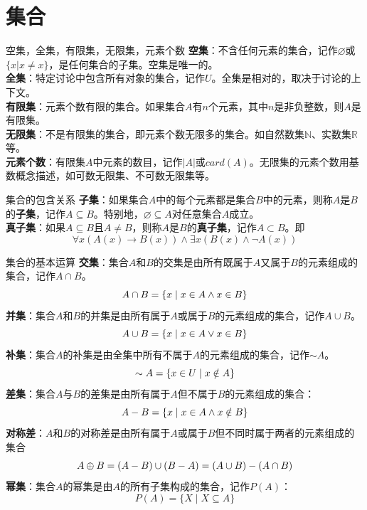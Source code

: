 \documentclass[lang=cn,11pt]{elegantbook}
\newcommand{\nothing}{\ensuremath{\varnothing}}
\begin{document}
\section{集合}
\begin{definition}{空集，全集，有限集，无限集，元素个数}
\textbf{空集}：不含任何元素的集合，记作$\nothing$或$\{x|x\ne x\}$，是任何集合的子集。空集是唯一的。\\
\textbf{全集}：特定讨论中包含所有对象的集合，记作$U$。全集是相对的，取决于讨论的上下文。\\
\textbf{有限集}：元素个数有限的集合。如果集合$A$有$n$个元素，其中$n$是非负整数，则$A$是有限集。\\
\textbf{无限集}：不是有限集的集合，即元素个数无限多的集合。如自然数集$\mathbb{N}$、实数集$\mathbb{R}$等。\\
\textbf{元素个数}：有限集$A$中元素的数目，记作$|A|$或$card(A)$。无限集的元素个数用基数概念描述，如可数无限集、不可数无限集等。
\end{definition}
\begin{definition}{集合的包含关系}
    \textbf{子集}：如果集合$A$中的每个元素都是集合$B$中的元素，则称$A$是$B$的\textbf{子集}，记作$A \subseteq B$。特别地，$\varnothing\subseteq A$对任意集合$A$成立。\\
    \textbf{真子集}：如果$A \subseteq B$且$A \neq B$，则称$A$是$B$的\textbf{真子集}，记作$A \subset B$。即\vspace{-10pt}
    \[\forall x(A(x) \rightarrow B(x)) \land \exists x(B(x) \land \neg A(x))\]
\end{definition}
\begin{definition}{集合的基本运算}
\textbf{交集}：集合$A$和$B$的交集是由所有既属于$A$又属于$B$的元素组成的集合，记作$A \cap B$。\vspace{-10pt}
$$A \cap B = \{x \mid x \in A \land x \in B\}\vspace{-10pt}$$
\textbf{并集}：集合$A$和$B$的并集是由所有属于$A$或属于$B$的元素组成的集合，记作$A \cup B$。\vspace{-10pt}
$$A \cup B = \{x \mid x \in A \lor x \in B\}\vspace{-10pt}$$
\textbf{补集}：集合$A$的补集是由全集中所有不属于$A$的元素组成的集合，记作$\sim  A$。\vspace{-10pt}
$$\sim A = \{x \in U \mid x \notin A\}\vspace{-10pt}$$
\textbf{差集}：集合$A$与$B$的差集是由所有属于$A$但不属于$B$的元素组成的集合：\vspace{-10pt}
$$A-B = \{x \mid x \in A \land x \notin B\}\vspace{-10pt}$$
\textbf{对称差}：$A$和$B$的对称差是由所有属于$A$或属于$B$但不同时属于两者的元素组成的集合\vspace{-10pt}
$$A\oplus B = (A - B) \cup (B -A) = (A \cup B)- (A \cap B)\vspace{-10pt}$$
\textbf{幂集}：集合$A$的幂集是由$A$的所有子集构成的集合，记作$P(A)$：\vspace{-10pt}
$$P(A) = \{X \mid X \subseteq A\}$$
\end{definition}
\end{document}
